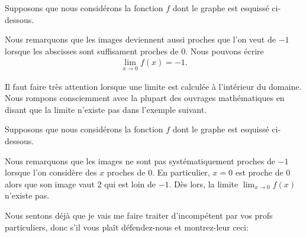 \documentclass[main.tex]{subfiles}
\begin{document}
\begin{example}

    Supposons que nous considérons la fonction $f$ dont le graphe est esquissé ci-dessous.

    \begin{center}
        \begin{plot}{0.5}{-6}{-6}{6}{6}
        \end{plot}
    \end{center}

    Nous remarquons que les images deviennent aussi proches que l'on veut de $-1$
    lorsque les abscisses sont suffisament proches de $0$.
    Nous pouvons écrire
    \begin{align}
        \lim_{x \to 0} f(x) = -1.
    \end{align}
\end{example}

Il faut faire très attention
lorsque une limite est calculée à l'intérieur du domaine.
Nous rompons consciemment avec la plupart des ouvrages mathématiques
en disant que la limite n'existe pas dans l'exemple suivant.

\begin{example}

    Supposons que nous considérons la fonction $f$ dont le graphe est esquissé ci-dessous.

    \begin{center}
        \begin{plot}{0.5}{-6}{-6}{6}{6}
        \end{plot}
    \end{center}

    Nous remarquons que les images ne sont pas systématiquement proches de $-1$
    lorsque l'on considère des $x$ proches de $0$.
    En particulier, $x = 0$ est proche de $0$
    alors que son image vaut $2$ qui est loin de $-1$.
    Dès lors,
    la limite $\lim_{x \to 0} f(x)$ n'existe pas.
\end{example}

Nous sentons déjà que je vais me faire traiter d'incompétent par vos profs particuliers,
donc s'il vous plaît défendez-nous et montrez-leur ceci:
\end{document}
